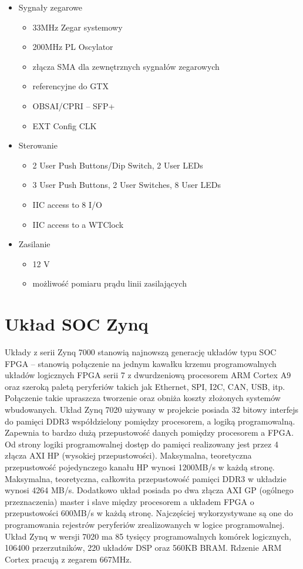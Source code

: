 \documentclass[a4paper,11pt,oneside]{report}  %
\begin{document}
\begin{itemize}
\item Sygnały zegarowe
	\begin{itemize}
	\item 33MHz Zegar systemowy
	\item 200MHz PL Oscylator
	\item złącza SMA dla zewnętrznych sygnałów zegarowych
	\item referencyjne do GTX 
	\item OBSAI/CPRI – SFP+ 
	\item EXT Config CLK
	\end{itemize}

\item Sterowanie
	\begin{itemize}
	\item 2 User Push Buttons/Dip Switch, 2 User LEDs
	\item 3 User Push Buttons, 2 User Switches, 8 User LEDs
	\item IIC access to 8 I/O
	\item IIC access to a WTClock
	\end{itemize}

\item Zasilanie
	\begin{itemize}
	\item 12 V 
	\item możliwość pomiaru prądu linii zasilających
	\end{itemize}
\end{itemize}

\section{Układ SOC Zynq}
Układy z serii Zynq 7000 stanowią najnowszą generację układów typu SOC FPGA – stanowią połączenie na jednym kawałku krzemu programowalnych układów logicznych FPGA serii 7 z dwurdzeniową procesorem ARM Cortex A9 oraz szeroką paletą peryferiów takich jak Ethernet, SPI, I2C, CAN, USB, itp. Połączenie takie upraszcza tworzenie oraz obniża koszty złożonych systemów wbudowanych. Układ Zynq 7020 używany w projekcie posiada 32 bitowy interfejs do pamięci DDR3 współdzielony pomiędzy procesorem, a logiką programowalną. Zapewnia to bardzo dużą przepustowość danych pomiędzy procesorem a FPGA. Od strony logiki programowalnej dostęp do pamięci realizowany jest przez 4 złącza AXI HP (wysokiej przepustowości). Maksymalna, teoretyczna przepustowość pojedynczego kanału HP wynosi 1200MB/s w każdą stronę. Maksymalna, teoretyczna, całkowita przepustowość pamięci DDR3 w układzie wynosi 4264 MB/s. Dodatkowo układ posiada po dwa złącza AXI GP (ogólnego przeznaczenia) master i slave między procesorem a układem FPGA o przepustowości 600MB/s w każdą stronę. Najczęściej wykorzystywane są one do programowania rejestrów peryferiów zrealizowanych w logice programowalnej. Układ Zynq w wersji 7020 ma 85 tysięcy programowalnych komórek logicznych, 106400 przerzutników, 220 układów DSP oraz 560KB BRAM. Rdzenie ARM Cortex pracują z zegarem 667MHz.
\end{document}
